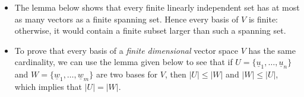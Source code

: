 \documentclass[11pt,twoside]{report}
\newcommand{\vecnot}{\underline}
\begin{document}
\begin{itemize}
\begin{itemize}
\item The lemma below shows that every finite linearly independent set has at most as many vectors as a finite spanning set.  Hence every basis of $V$ is finite: otherwise, it would contain a finite subset larger than such a spanning set.

\item To prove that every basis of a \emph{finite dimensional} vector space $V$ has the same cardinality, we can use the lemma given below to see that if $U = \{\vecnot{u}_1, \dots, \vecnot{u}_n\}$ and $W = \{\vecnot{w}_1, \dots, \vecnot{w}_m\}$ are two bases for $V$, then $|U| \le |W|$ and $|W| \le |U|$, which implies that $|U| = |W|$.

%
%
%
%
\end{itemize}




\end{itemize}
\end{document}
